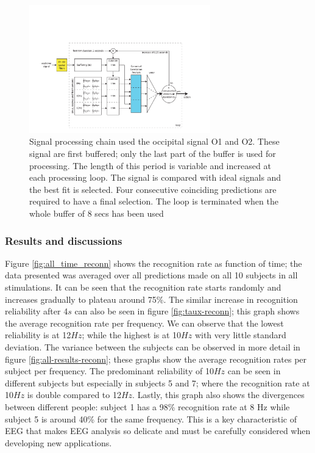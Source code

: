 \documentclass{svmult}
\begin{document}
\begin{figure}
\center
\includegraphics[width=0.7\textwidth]{figures/schema-openvibe-cca.pdf}
\caption{Signal processing chain used the occipital signal O1 and O2. These signal are first buffered; only the last part of the buffer is used for processing. The length of this period is variable and increased at each processing loop. The signal is compared with ideal signals and the best fit is selected. Four consecutive coinciding predictions are required to have a final selection. The loop is terminated when the whole buffer of 8 secs has been used}
\label{fig:schema-openvibe-cca}
\end{figure}

\subsubsection{Results and discussions}
Figure \ref{fig:all_time_reconn} shows the recognition rate as function of time; the data presented was averaged over all predictions made on all 10 subjects in all stimulations. It can be seen that the recognition rate starts randomly and increases gradually to plateau around 75\%. The similar increase in recognition reliability after 4$s$ can also be seen in figure \ref{fig:taux-reconn}; this graph shows the average recognition rate per frequency. We can observe that the lowest reliability is at 12$Hz$; while the highest is at 10$Hz$ with very little standard deviation. The variance between the subjects can be observed in more detail in figure \ref{fig:all-results-reconn}; these graphs show the average recognition rates per subject per frequency. The predominant reliability of 10$Hz$ can be seen in different subjects but especially in subjects 5 and 7; where the recognition rate at 10$Hz$ is double compared to 12$Hz$. Lastly, this graph also shows the divergences between different people: subject 1 has a 98\% recognition rate at 8 Hz while subject 5 is around 40\% for the same frequency. This is a key characteristic of EEG that makes EEG analysis so delicate and must be carefully considered when developing new applications.
\end{document}

